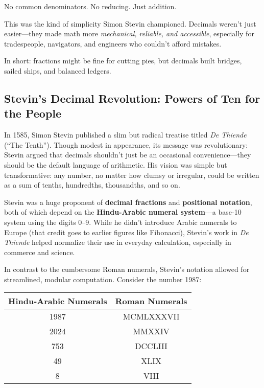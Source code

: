 No common denominators. No reducing. Just addition.

This was the kind of simplicity Simon Stevin championed. Decimals weren’t just easier—they made math more \textit{mechanical, reliable, and accessible}, especially for tradespeople, navigators, and engineers who couldn’t afford mistakes.


In short: fractions might be fine for cutting pies, but decimals built bridges, sailed ships, and balanced ledgers.

\subsection{Stevin’s Decimal Revolution: Powers of Ten for the People}

In 1585, Simon Stevin published a slim but radical treatise titled \textit{De Thiende} (“The Tenth”). Though modest in appearance, its message was revolutionary: Stevin argued that decimals shouldn’t just be an occasional convenience—they should be the default language of arithmetic. His vision was simple but transformative: any number, no matter how clumsy or irregular, could be written as a sum of tenths, hundredths, thousandths, and so on.

Stevin was a huge proponent of \textbf{decimal fractions} and \textbf{positional notation}, both of which depend on the \textbf{Hindu-Arabic numeral system}—a base-10 system using the digits 0–9. While he didn’t introduce Arabic numerals to Europe (that credit goes to earlier figures like Fibonacci), Stevin’s work in \textit{De Thiende} helped normalize their use in everyday calculation, especially in commerce and science.

In contrast to the cumbersome Roman numerals, Stevin’s notation allowed for streamlined, modular computation. Consider the number 1987:

\begin{center}
\begin{tabular}{|c|c|}
\hline
\textbf{Hindu-Arabic Numerals} & \textbf{Roman Numerals} \\
\hline
1987 & MCMLXXXVII \\
2024 & MMXXIV \\
753 & DCCLIII \\
49 & XLIX \\
8 & VIII \\
\hline
\end{tabular}
\end{center}

